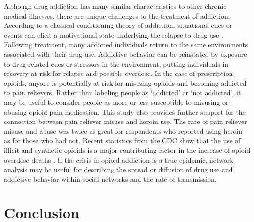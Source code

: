 \documentclass[sigconf]{acmart}
\begin{document}
Although drug addiction has many similar characteristics to other chronic 
medical illnesses, there are unique challenges to the treatment of addiction. 
According to a classical conditioning theory of addiction, situational cues or 
events can elicit a motivational state underlying the relapse to drug use
\cite{shaham03}. Following treatment, many addicted individuals return to the 
same environments associated with their drug use. Addictive behavior can be 
reinstated by exposure to drug-related cues or stressors in the environment,
putting individuals in recovery at risk for relapse and possible overdose. 
In the case of prescription opioids, anyone is potentially at risk for misusing 
opioids and becoming addicted to pain relievers. Rather than labeling people 
as `addicted' or `not addicted', it may be useful to consider people as more or 
less susceptible to misusing or abusing opioid pain medication. This study also 
provides further support for the connection between pain reliever misuse and 
heroin use. The rate of pain reliever misuse and abuse was twice as great for
respondents who reported using heroin as for those who had not. Recent 
statistics from the CDC show that the use of illicit and synthetic opioids 
is a major contributing factor in the increase of opioid overdose deaths 
\cite{cdc18}. If the crisis in opioid addiction is a true epidemic, network 
analysis may be useful for describing the spread or diffusion of drug use and 
addictive behavior within social networks and the rate of transmission. 


\section{Conclusion}
\end{document}
